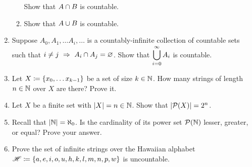 \begin{enumerate}
\begin{enumerate}
                Show that $A \cap B$ is countable.
            \item
                Show that $A \cup B$ is countable.
        \end{enumerate}
    \item
        Suppose $A_0, A_1, \dots A_i, \dots$ is a countably-infinite collection of
        countable sets such that $i \neq j ~\Rightarrow~ A_i \cap A_j = \varnothing$.
        Show that $\displaystyle\bigcup_{i = 0}^{\infty}A_i$ is countable.
    \item
        Let $X \defn \set*{x_0, \dots x_{k - 1}}$ be a set of size $k \in \mathbb{N}$.
        How many strings of length $n \in \mathbb{N}$ over $X$ are there?
        Prove it.
    \item
        Let $X$ be a finite set with $\lvert X\rvert = n \in \mathbb{N}$.
        Show that $\cardinality{\power{X}} = 2^n$.
    \item
        Recall that $\lvert\mathbb{N}\rvert = \aleph_0$.
        Is the cardinality of its power set $\power{\N}$ lesser, greater, or equal?
        Prove your answer.
    \item
        Prove the set of infinite strings over the Hawaiian alphabet
        $\mathscr{H} \defn \set*{a, e, i, o, u, h, k, l, m, n, p, w}$ is uncountable.
\end{enumerate}

